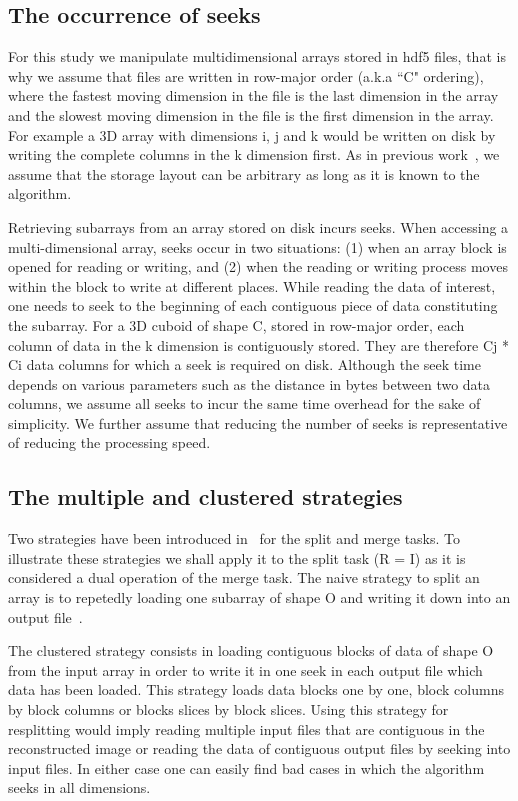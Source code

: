 \documentclass[conference]{IEEEtran}
\begin{document}
\subsection{The occurrence of seeks}
For this study we manipulate multidimensional arrays stored in hdf5 files,
that is why we assume that files are written in row-major order (a.k.a ``C" ordering),
where the fastest moving dimension in the file is the last dimension in the
array and the slowest moving dimension in the file is the first dimension
in the array. For example a 3D array with dimensions i, j and k would be
written on disk by writing the complete columns in the k dimension first.
As in previous work~\cite{seqalgorithms}, we assume that the storage layout can
be arbitrary as long as it is known to the algorithm.

Retrieving subarrays from an array stored on disk incurs seeks. When accessing a
multi-dimensional array, seeks occur in two situations: (1) when an array block
is opened for reading or writing, and (2) when the reading or writing process
moves within the block to write at different places. While reading the data of
interest, one needs to seek to the beginning of each contiguous piece of data
constituting the subarray. For a 3D cuboid of shape C, stored in row-major order,
each column of data in the k dimension is contiguously stored. They are therefore
Cj * Ci data columns for which a seek is required on disk. Although the seek
time depends on various parameters such as the distance in bytes between two
data columns, we assume all seeks to incur the same time overhead for the sake
of simplicity. We further assume that reducing the number of seeks is
representative of reducing the processing speed.

\subsection{The multiple and clustered strategies}
Two strategies have been introduced in~\cite{seqalgorithms} for the split and
merge tasks. To illustrate these strategies we shall apply it to the split task
(R = I) as it is considered a dual operation of the merge task. The naive
strategy to split an array is to repetedly loading one subarray of shape O and
writing it down into an output file~\cite{seqalgorithms}.

The clustered strategy consists in loading contiguous blocks of data of shape O
from the input array in order to write it in one seek in each output file which
data has been loaded. This strategy loads data blocks one by one, block columns
by block columns or blocks slices by block slices. Using this strategy for
resplitting would imply reading multiple input files that are contiguous in the
reconstructed image or reading the data of contiguous output files by seeking into
input files. In either case one can easily find bad cases in which the algorithm
seeks in all dimensions.
\end{document}
